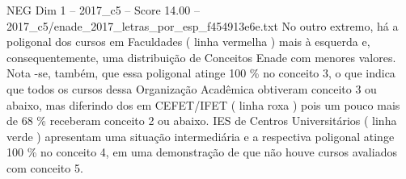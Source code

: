 \begin{textsample}{NEG Dim 1 – 2017\_c5 – Score 14.00 – 2017\_c5/enade\_2017\_letras\_por\_esp\_f454913e6e.txt}
No outro extremo, há a poligonal dos cursos em Faculdades ( linha vermelha ) mais à esquerda e, consequentemente, uma distribuição de Conceitos Enade com menores valores.
Nota -se, também, que essa poligonal atinge 100 \% no conceito 3, o que indica que todos os cursos dessa Organização Acadêmica obtiveram conceito 3 ou abaixo, mas diferindo dos em CEFET/IFET ( linha roxa ) pois um pouco mais de 68 \% receberam conceito 2 ou abaixo.
IES de Centros Universitários ( linha verde ) apresentam uma situação intermediária e a respectiva poligonal atinge 100 \% no conceito 4, em uma demonstração de que não houve cursos avaliados com conceito 5.

\end{textsample}
